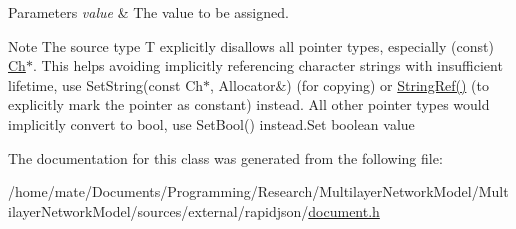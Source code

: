 \begin{DoxyParams}{Parameters}
{\em value} & The value to be assigned.\\
\hline
\end{DoxyParams}
\begin{DoxyNote}{Note}
The source type {\ttfamily T} explicitly disallows all pointer types, especially ({\ttfamily const}) \hyperlink{classGenericValue_ade0e0ce64ccd5d852da57a35e720bafb}{Ch}$\ast$. This helps avoiding implicitly referencing character strings with insufficient lifetime, use Set\+String(const Ch$\ast$, Allocator\&) (for copying) or \hyperlink{document_8h_aa6b9fd9f6aa49405a574c362ba9af6b5}{String\+Ref()} (to explicitly mark the pointer as constant) instead. All other pointer types would implicitly convert to {\ttfamily bool}, use Set\+Bool() instead.\+Set boolean value 
\end{DoxyNote}


The documentation for this class was generated from the following file\+:\begin{DoxyCompactItemize}
\item 
/home/mate/\+Documents/\+Programming/\+Research/\+Multilayer\+Network\+Model/\+Multilayer\+Network\+Model/sources/external/rapidjson/\hyperlink{document_8h}{document.\+h}\end{DoxyCompactItemize}
